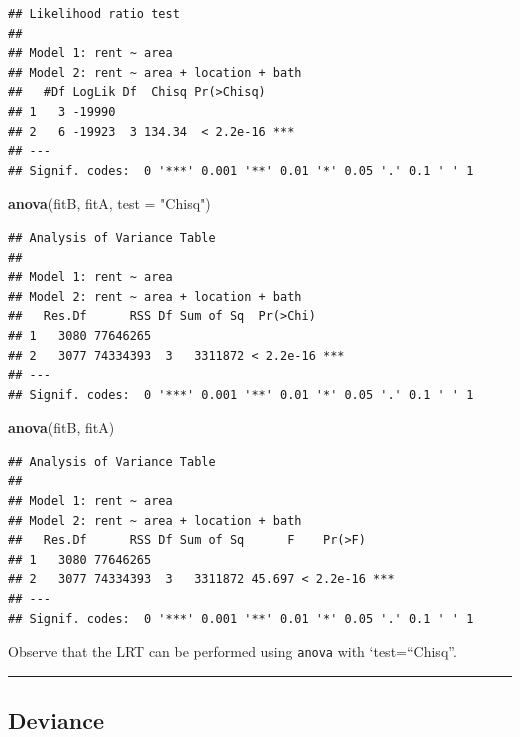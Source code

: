 \documentclass[
]{article}
\newenvironment{Shaded}{\begin{snugshade}}{\end{snugshade}}
\newcommand{\AttributeTok}[1]{\textcolor[rgb]{0.13,0.29,0.53}{#1}}
\newcommand{\FunctionTok}[1]{\textcolor[rgb]{0.13,0.29,0.53}{\textbf{#1}}}
\newcommand{\NormalTok}[1]{#1}
\newcommand{\StringTok}[1]{\textcolor[rgb]{0.31,0.60,0.02}{#1}}
\begin{document}
\begin{verbatim}
## Likelihood ratio test
## 
## Model 1: rent ~ area
## Model 2: rent ~ area + location + bath
##   #Df LogLik Df  Chisq Pr(>Chisq)    
## 1   3 -19990                         
## 2   6 -19923  3 134.34  < 2.2e-16 ***
## ---
## Signif. codes:  0 '***' 0.001 '**' 0.01 '*' 0.05 '.' 0.1 ' ' 1
\end{verbatim}

\begin{Shaded}
\begin{Highlighting}[]
\FunctionTok{anova}\NormalTok{(fitB, fitA, }\AttributeTok{test =} \StringTok{"Chisq"}\NormalTok{)}
\end{Highlighting}
\end{Shaded}

\begin{verbatim}
## Analysis of Variance Table
## 
## Model 1: rent ~ area
## Model 2: rent ~ area + location + bath
##   Res.Df      RSS Df Sum of Sq  Pr(>Chi)    
## 1   3080 77646265                           
## 2   3077 74334393  3   3311872 < 2.2e-16 ***
## ---
## Signif. codes:  0 '***' 0.001 '**' 0.01 '*' 0.05 '.' 0.1 ' ' 1
\end{verbatim}

\begin{Shaded}
\begin{Highlighting}[]
\FunctionTok{anova}\NormalTok{(fitB, fitA)}
\end{Highlighting}
\end{Shaded}

\begin{verbatim}
## Analysis of Variance Table
## 
## Model 1: rent ~ area
## Model 2: rent ~ area + location + bath
##   Res.Df      RSS Df Sum of Sq      F    Pr(>F)    
## 1   3080 77646265                                  
## 2   3077 74334393  3   3311872 45.697 < 2.2e-16 ***
## ---
## Signif. codes:  0 '***' 0.001 '**' 0.01 '*' 0.05 '.' 0.1 ' ' 1
\end{verbatim}

Observe that the LRT can be performed using \texttt{anova} with
`test=``Chisq''.

\begin{center}\rule{0.5\linewidth}{0.5pt}\end{center}

\hypertarget{deviance}{%
\subsection{Deviance}\label{deviance}}
\end{document}
